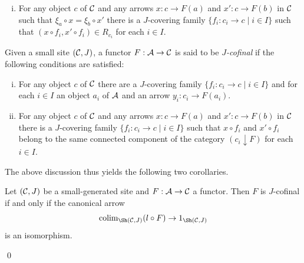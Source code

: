 \documentclass[a4paper,12pt]{article}
\begin{document}
\begin{enumerate}[(1)]
\begin{enumerate}[(i)]
		\item For any object $c$ of $\cal C$ and any arrows $x:c\to F(a)$ and $x':c\to F(b)$ in $\cal C$ such that $\xi_{a}\circ x= \xi_{b}\circ x'$ there is a $J$-covering family $\{f_i: c_i \to c \mid i\in I\}$ such that $(x\circ f_i, x'\circ f_i)\in R_{c_{i}}$ for each $i\in I$. 
	\end{enumerate}	 
\end{enumerate}


\begin{definition}\label{defrelcofinality}
	Given a small site $({\cal C}, J)$, a functor $F:{\cal A}\to {\cal C}$ is said to be \emph{$J$-cofinal} if the following conditions are satisfied:
	\begin{enumerate}[(i)]
		\item For any object $c$ of $\cal C$ there are a $J$-covering family $\{f_i: c_i \to c \mid i\in I\}$ and for each $i\in I$ an object $a_{i}$ of $\cal A$ and an arrow $y_i:c_{i}\to F(a_{i})$.
		
		\item For any object $c$ of $\cal C$ and any arrows $x:c\to F(a)$ and $x':c\to F(b)$ in $\cal C$ there is a $J$-covering family $\{f_i: c_i \to c \mid i\in I\}$ such that $x\circ f_i$ and $x'\circ f_i$ belong to the same connected component of the category $(c_i \downarrow F)$ for each $i\in I$. 
	\end{enumerate}		
\end{definition}

The above discussion thus yields the following two corollaries.

\begin{corollary}\label{corcofinalcharacterization}
	Let $({\cal C}, J)$ be a small-generated site and $F:{\cal A}\to {\cal C}$	a functor. Then $F$ is $J$-cofinal if and only if the canonical arrow
	\[
	\textup{colim}_{\Sh({\cal C}, J)}(l\circ F) \to 1_{\Sh({\cal C}, J)}
	\] 
	is an isomorphism.
\end{corollary}\qed
\end{document}
